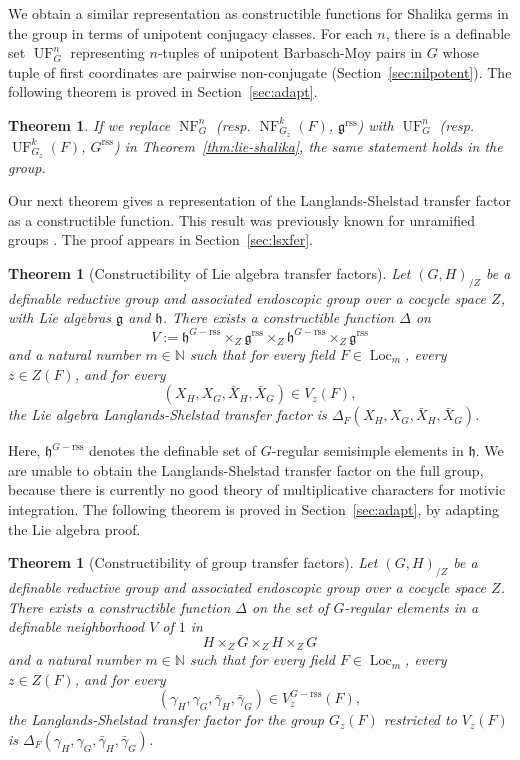 \documentclass[12pt]{amsart}
\newcommand{\op}[1]{\operatorname{#1}}
\newcommand{\ring}[1]{{\mathbb #1}}
\def\NF{\op{NF}}
\def\UF{\op{UF}}
\newcommand{\fg}{\mathfrak{g}}
\newcommand{\fh}{\mathfrak{h}}
\newcommand{\reg}{\mathrm{rss}}
\theoremstyle{plain}
\newtheorem{theorem}[thm]{Theorem}
\theoremstyle{definition}
\begin{document}
We obtain a similar representation as constructible functions for
Shalika germs in the group in terms of unipotent conjugacy classes.
For each $n$, there is a definable set $\UF^n_G$ representing
$n$-tuples of unipotent Barbasch-Moy pairs in $G$ whose tuple of first
coordinates are pairwise non-conjugate (Section~\ref{sec:nilpotent}).
The following theorem is proved in Section~\ref{sec:adapt}.

\begin{theorem} If we replace $\NF^n_G$ (resp. $\NF^{k}_{G_z}(F)$,
  $\fg^\reg$) with $\UF^n_{G}$ (resp. $\UF^{k}_{G_z}(F)$, $G^\reg$)
  in Theorem~\ref{thm:lie-shalika}, the same statement holds in the
  group.
\end{theorem}

Our next theorem gives a representation of the Langlands-Shelstad
transfer factor as a constructible function.  This result was
previously known for unramified groups \cite{CHL}.  The proof appears
in Section~\ref{sec:lsxfer}. 

\begin{theorem}[Constructibility of Lie algebra transfer
  factors]\label{thm:xfer-factor} 
  Let $(G,H)_{/Z}$ be a definable reductive group and associated
  endoscopic group over a cocycle space $Z$, with Lie algebras $\fg$
  and $\fh$.  There exists a constructible function $\Delta$ on
\begin{equation}\label{eqn:delta-domain}
V := \fh^{G-\reg}\times_Z
  \fg^\reg\times_Z
\fh^{G-\reg}\times_Z
  \fg^\reg
\end{equation}
and a natural number $m\in \ring{N}$ such that for every field $F\in
\op{Loc}_{m}$, every $z\in Z(F)$, and for every 
\[
(X_H,X_G,\bar X_H,\bar X_G)\in
V_z(F),\]  
the Lie algebra Langlands-Shelstad transfer factor is
$\Delta_F(X_H,X_G,\bar X_H,\bar X_G)$.
\end{theorem}

Here, $\fh^{G-\reg}$ denotes the definable set of $G$-regular
semisimple elements in $\fh$.  We are unable to obtain the
Langlands-Shelstad transfer factor on the full group, because there is
currently no good theory of multiplicative characters for motivic
integration. The following theorem is proved in
Section~\ref{sec:adapt}, by adapting the Lie algebra proof.

\begin{theorem}[Constructibility of group transfer factors]
\label{thm:gtf} 
Let
  $(G,H)_{/Z}$ be a definable reductive group and associated
  endoscopic group over a cocycle space $Z$.  
  There exists a constructible
  function $\Delta$ on the set of $G$-regular elements in
   a definable neighborhood $V$ of $1$ in
\[
H\times_Z  G\times_Z H\times_Z   G
\] 
and a natural number $m\in \ring{N}$ such that for every field $F\in
\op{Loc}_{m}$, every $z\in Z(F)$, and for every 
\[
(\gamma_H,\gamma_G,\bar \gamma_H,\bar \gamma_G)\in V^{G-\reg}_z(F),\] the
Langlands-Shelstad transfer factor for the group $G_z(F)$ restricted to
$V_z(F)$ is $\Delta_F(\gamma_H,\gamma_G,\bar \gamma_H,\bar
\gamma_G)$.
\end{theorem}
\end{document}
